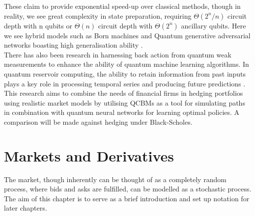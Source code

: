 \documentclass[12pt]{article}
\numberwithin{equation}{section}
\begin{document}
These claim to provide exponential speed-up over classical 
methods, though in reality, we see great complexity in state preparation, requiring 
$\Theta(2^n/n)$ circuit depth with n qubits or $\Theta(n)$ circuit depth with 
$\Theta(2^n)$ ancillary qubits\autocite{zhang_quantum_2022}. Here we see hybrid models such as Born machines
and Quantum generative adversarial networks boasting high generalisation ability
\autocite{ganguly_implementing_nodate,gili_2022_do,horowitz_quantum_2022}.
\\
There has also been research in harnessing back action from quantum weak 
measurements to enhance the ability of quantum machine learning algorithms. 
In quantum reservoir computing,
the ability to retain information from past inputs plays a key role in processing 
temporal series and producing future predictions
\autocite{franceschetto_harnessing_2024,fujii_quantum_2020,garcia-beni_squeezing_2024,mujal_time-series_2023}.
\\
This research aims to combine the needs of financial firms in hedging portfolios
using realistic market models by utilising QCBMs as a tool 
for simulating paths in combination with quantum neural networks for learning 
optimal policies. A comparison will be made against hedging under Black-Scholes.


\clearpage
\section{Markets and Derivatives}
The market, though inherently can be thought of as a completely random process,
where bids and asks are fulfilled, can be modelled as a stochastic process. The 
aim of this chapter is to serve as a brief introduction and set up notation for 
later chapters. \\
\end{document}

